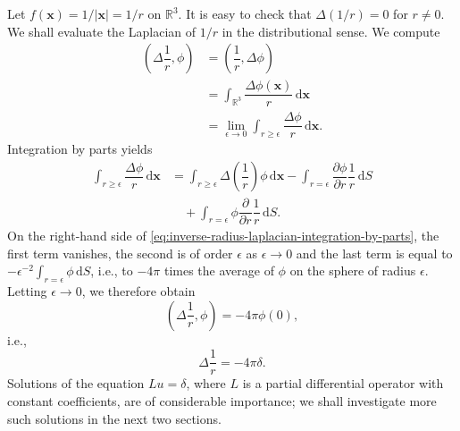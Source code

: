 \begin{Example}
\label{ex:inverse-radius-laplacian}
Let $f(\bm{x})=1/|\bm{x}|=1/r$ on $\mathbb{R}^3$. It is easy to check that $\Delta(1/r)=0$ for $r\ne0$. We shall evaluate the Laplacian of $1/r$ in the distributional sense. We compute\[
\begin{aligned}
\left(\Delta\dfrac1r,\phi\right)&=\left(\dfrac1r,\Delta\phi\right)\\
&=\int_{\mathbb{R}^3}\dfrac{\Delta\phi(\bm{x})}r\,\mathrm{d}\bm{x}\\
&=\lim_{\epsilon\to0}\int_{r\geq\epsilon}\dfrac{\Delta\phi}r\,\mathrm{d}\bm{x}.
\end{aligned}
\]Integration by parts yields
\begin{equation}\label{eq:inverse-radius-laplacian-integration-by-parts}
\begin{aligned}
\int_{r\geq\epsilon}\dfrac{\Delta\phi}r\,\mathrm{d}\bm{x}
&=\int_{r\geq\epsilon}\Delta\left(\dfrac1r\right)\phi\,\mathrm{d}\bm{x}
-\int_{r=\epsilon}\dfrac{\partial\phi}{\partial r}\dfrac1r\,\mathrm{d}S\\
&\quad+\int_{r=\epsilon}\phi\dfrac{\partial}{\partial r}\dfrac1r\,\mathrm{d}S.
\end{aligned}
\end{equation}
On the right-hand side of \eqref{eq:inverse-radius-laplacian-integration-by-parts}, the first term vanishes, the second is of order $\epsilon$ as $\epsilon\to0$ and the last term is equal to $-\epsilon^{-2}\int_{r=\epsilon}\phi\,\mathrm{d}S$, i.e., to $-4\pi$ times the average of $\phi$ on the sphere of radius $\epsilon$. Letting $\epsilon\to0$, we therefore obtain
\begin{equation}\label{eq:inverse-radius-laplacian-delta-pairing}
\left(\Delta\dfrac1r,\phi\right)=-4\pi\phi(0),
\end{equation}
i.e.,
\begin{equation}\label{eq:inverse-radius-laplacian-delta}
\Delta\dfrac1r=-4\pi\delta.
\end{equation}
Solutions of the equation $Lu=\delta$, where $L$ is a partial differential operator with constant coefficients, are of considerable importance; we shall investigate more such solutions in the next two sections.
\end{Example}
